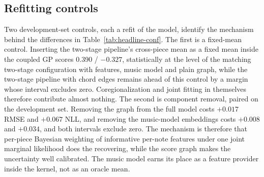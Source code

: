 \subsection{Refitting controls}
Two development-set controls, each a refit of the model, identify the
mechanism behind the differences in Table~\ref{tab:headline-conf}. The first
is a fixed-mean control. Inserting the two-stage pipeline's cross-piece mean
as a fixed mean inside the coupled GP scores 0.390 / $-0.327$, statistically
at the level of the matching two-stage configuration with features, music
model and plain graph, while the two-stage pipeline with chord edges remains
ahead of this control by a margin whose interval excludes zero.
Coregionalization and joint fitting in themselves therefore contribute almost
nothing. The second is component removal, paired on the development set.
Removing the graph from the full model costs $+0.017$ RMSE and $+0.067$ NLL,
and removing the music-model embeddings costs $+0.008$ and $+0.034$, and both
intervals exclude zero. The mechanism is therefore that per-piece Bayesian
weighting of informative per-note features under one joint marginal
likelihood does the recovering, while the score graph makes the uncertainty
well calibrated. The music model earns its place as a feature provider inside
the kernel, not as an oracle mean.

